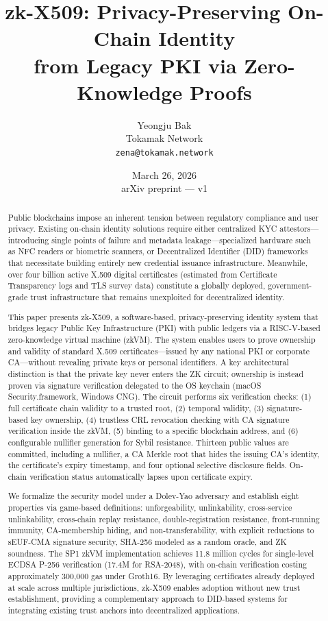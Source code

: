\documentclass[11pt, a4paper]{article}
\title{zk-X509: Privacy-Preserving On-Chain Identity\\from Legacy PKI via Zero-Knowledge Proofs}
\author{Yeongju Bak\\
Tokamak Network\\
\texttt{zena@tokamak.network}}
\date{March 26, 2026\\{\small arXiv preprint --- v1}}
\begin{document}
\maketitle


\begin{abstract}

Public blockchains impose an inherent tension between regulatory
compliance and user privacy. Existing on-chain identity solutions
require either centralized KYC attestors---introducing single points of
failure and metadata leakage---specialized hardware such as NFC readers
or biometric scanners, or Decentralized Identifier (DID) frameworks that
necessitate building entirely new credential issuance infrastructure.
Meanwhile, over four billion active X.509 digital certificates (estimated from Certificate Transparency logs and TLS survey data)
constitute a globally deployed, government-grade trust infrastructure
that remains unexploited for decentralized identity.

This paper presents zk-X509, a software-based, privacy-preserving
identity system that bridges legacy Public Key Infrastructure (PKI) with
public ledgers via a RISC-V-based zero-knowledge virtual machine (zkVM).
The system enables users to prove ownership and validity of standard
X.509 certificates---issued by any national PKI or corporate
CA---without revealing private keys or personal identifiers. A key
architectural distinction is that the private key never enters the ZK
circuit; ownership is instead proven via signature verification
delegated to the OS keychain (macOS Security.framework, Windows CNG). The
circuit performs six verification checks: (1) full certificate chain validity to
a trusted root, (2) temporal validity, (3) signature-based key
ownership, (4) trustless CRL revocation checking with CA signature
verification inside the zkVM, (5) binding to a specific blockchain
address, and (6) configurable nullifier generation for Sybil resistance.
Thirteen public values are committed, including a nullifier, a CA Merkle
root that hides the issuing CA's identity, the certificate's expiry
timestamp, and four optional selective disclosure fields. On-chain
verification status automatically lapses upon certificate expiry.

We formalize the security model under a Dolev-Yao adversary and
establish eight properties via game-based definitions: unforgeability,
unlinkability, cross-service unlinkability, cross-chain replay resistance, double-registration resistance, front-running immunity,
CA-membership hiding, and non-transferability, with explicit reductions to
sEUF-CMA signature security, SHA-256 modeled as a random oracle, and ZK
soundness. The SP1 zkVM implementation achieves 11.8 million cycles for
single-level ECDSA P-256 verification (17.4M for RSA-2048), with
on-chain verification costing approximately 300,000 gas under Groth16.
By leveraging certificates already deployed at scale across multiple
jurisdictions, zk-X509 enables adoption without new trust establishment,
providing a complementary approach to DID-based systems for integrating
existing trust anchors into decentralized applications.
\end{abstract}
\end{document}
